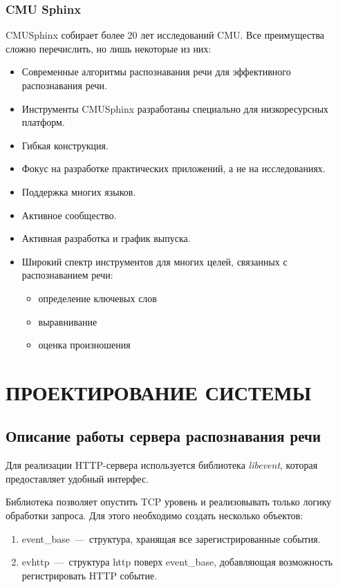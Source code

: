 \subsection{CMU Sphinx}

CMUSphinx собирает более 20 лет исследований CMU. Все преимущества сложно перечислить,
но лишь некоторые из них:
\begin{itemize}
    \item Современные алгоритмы распознавания речи для эффективного распознавания речи.
    \item Инструменты CMUSphinx разработаны специально для низкоресурсных платформ.
    \item Гибкая конструкция.
    \item Фокус на разработке практических приложений, а не на исследованиях.
    \item Поддержка многих языков.
    \item Активное сообщество.
    \item Активная разработка и график выпуска.
    \item Широкий спектр инструментов для многих целей, связанных с распознаванием речи:
    \begin{itemize}
        \item определение ключевых слов
        \item выравнивание
        \item оценка произношения
    \end{itemize}
\end{itemize}

\chapter{ПРОЕКТИРОВАНИЕ СИСТЕМЫ}
\section{Описание работы сервера распознавания речи}
Для реализации HTTP-сервера используется библиотека \textit{libevent}, которая
предоставляет удобный интерфес.

Библиотека позволяет опустить TCP уровень и реализовывать только логику обработки
запроса. Для этого необходимо создать несколько объектов:
\begin{enumerate}
    \item event\_base~---~структура, хранящая все зарегистрированные события.
    \item evhttp~---~структура http поверх event\_base, добавляющая возможность
    регистрировать HTTP событие.
\end{enumerate}

